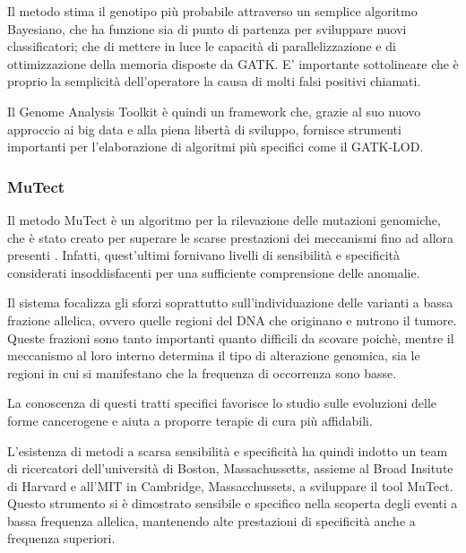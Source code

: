 Il metodo stima il genotipo più probabile attraverso un semplice algoritmo Bayesiano, che ha funzione sia di punto di partenza per sviluppare nuovi classificatori; che di mettere in luce le capacità di parallelizzazione e di ottimizzazione della memoria disposte da GATK.
E' importante sottolineare che è proprio la semplicità dell'operatore la causa di molti falsi positivi chiamati.

Il Genome Analysis Toolkit è quindi un framework che, grazie al suo nuovo approccio ai big data e alla piena libertà di sviluppo, fornisce strumenti importanti per l'elaborazione di algoritmi più specifici come il GATK-LOD.

\subsubsection{MuTect}
Il metodo MuTect è un algoritmo per la rilevazione delle mutazioni genomiche, che è stato creato per superare le scarse prestazioni dei meccanismi fino ad allora presenti \cite{Cibulskis2013}.
Infatti, quest'ultimi fornivano livelli di sensibilità e specificità considerati insoddisfacenti per una sufficiente comprensione delle anomalie.

Il sistema focalizza gli sforzi soprattutto sull'individuazione delle varianti a bassa frazione allelica, ovvero quelle regioni del DNA che originano e nutrono il tumore.
Queste frazioni sono tanto importanti quanto difficili da scovare poichè, mentre il meccanismo al loro interno determina il tipo di alterazione genomica, sia le regioni in cui si manifestano che la frequenza di occorrenza sono basse.

La conoscenza di questi tratti specifici favorisce lo studio sulle evoluzioni delle forme cancerogene e aiuta a proporre terapie di cura più affidabili.

L'esistenza di metodi a scarsa sensibilità e specificità ha quindi indotto un team di ricercatori dell'università di Boston, Massachussetts, assieme al Broad Insitute di Harvard e all'MIT in Cambridge, Massacchussets, a sviluppare il tool MuTect.
Questo strumento si è dimostrato sensibile e specifico nella scoperta degli eventi a bassa frequenza allelica, mantenendo alte prestazioni di specificità anche a frequenza superiori.

